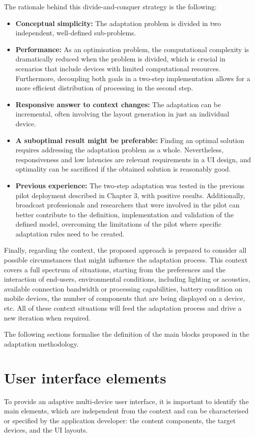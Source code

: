 The rationale behind this divide-and-conquer strategy is the following: 
\begin{itemize}
	\item \textbf{Conceptual simplicity:} The adaptation problem is divided in two independent, well-defined sub-problems.
	\item \textbf{Performance:} As an optimisation problem, the computational complexity is dramatically reduced when the problem is divided, which is crucial in scenarios that include devices with limited computational resources. Furthermore, decoupling both goals in a two-step implementation allows for a more efficient distribution of processing in the second step.
	\item \textbf{Responsive answer to context changes:} The adaptation can be incremental, often involving the layout generation in just an individual device.
	\item \textbf{A suboptimal result might be preferable:} Finding an optimal solution requires addressing the adaptation problem as a whole. Nevertheless, responsiveness and low latencies are relevant requirements in a UI design, and optimality can be sacrificed if the obtained solution is reasonably good.
	\item \textbf{Previous experience:} The two-step adaptation was tested in the previous pilot deployment described in Chapter 3, with positive results. Additionally, broadcast professionals and researchers that were involved in the pilot can better contribute to the definition, implementation and validation of the defined model, overcoming the limitations of the pilot where specific adaptation rules need to be created.
\end{itemize}

Finally, regarding the context, the proposed approach is prepared to consider all possible circumstances that might influence the adaptation process. 
This context covers a full spectrum of situations, starting from the preferences and the interaction of end-users, environmental conditions, including lighting or acoustics, available connection bandwidth or processing capabilities, battery condition on mobile devices, the number of components that are being displayed on a device, etc. 
All of these context situations will feed the adaptation process and drive a new iteration when required.

The following sections formalise the definition of the main blocks proposed in the adaptation methodology.

\section{User interface elements}\label{uie}
To provide an adaptive multi-device user interface, it is important to identify the main elements, which are independent from the context and can be characterised or specified by the application developer: the content components, the target devices, and the  UI layouts.


